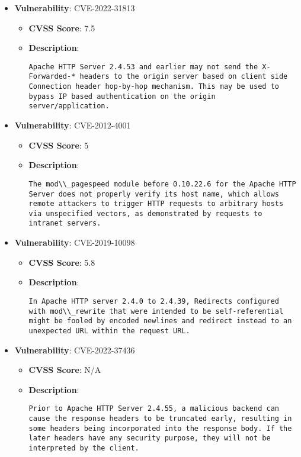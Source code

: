 \documentclass{article}
\begin{document}
\begin{itemize}
        \item \textbf{Vulnerability}: CVE-2022-31813
        \begin{itemize}
            \item \textbf{CVSS Score}:  7.5 
            \item \textbf{Description}:
            \parbox[t]{0.9\linewidth}{
                \verb|Apache HTTP Server 2.4.53 and earlier may not send the X-Forwarded-* headers to the origin server based on client side Connection header hop-by-hop mechanism. This may be used to bypass IP based authentication on the origin server/application.|
            }
        \end{itemize}
    
        \item \textbf{Vulnerability}: CVE-2012-4001
        \begin{itemize}
            \item \textbf{CVSS Score}:  5 
            \item \textbf{Description}:
            \parbox[t]{0.9\linewidth}{
                \verb|The mod\\_pagespeed module before 0.10.22.6 for the Apache HTTP Server does not properly verify its host name, which allows remote attackers to trigger HTTP requests to arbitrary hosts via unspecified vectors, as demonstrated by requests to intranet servers.|
            }
        \end{itemize}
    
        \item \textbf{Vulnerability}: CVE-2019-10098
        \begin{itemize}
            \item \textbf{CVSS Score}:  5.8 
            \item \textbf{Description}:
            \parbox[t]{0.9\linewidth}{
                \verb|In Apache HTTP server 2.4.0 to 2.4.39, Redirects configured with mod\\_rewrite that were intended to be self-referential might be fooled by encoded newlines and redirect instead to an unexpected URL within the request URL.|
            }
        \end{itemize}
    
        \item \textbf{Vulnerability}: CVE-2022-37436
        \begin{itemize}
            \item \textbf{CVSS Score}:  N/A 
            \item \textbf{Description}:
            \parbox[t]{0.9\linewidth}{
                \verb|Prior to Apache HTTP Server 2.4.55, a malicious backend can cause the response headers to be truncated early, resulting in some headers being incorporated into the response body. If the later headers have any security purpose, they will not be interpreted by the client.|
            }
        \end{itemize}
    

\end{itemize}
\end{document}
